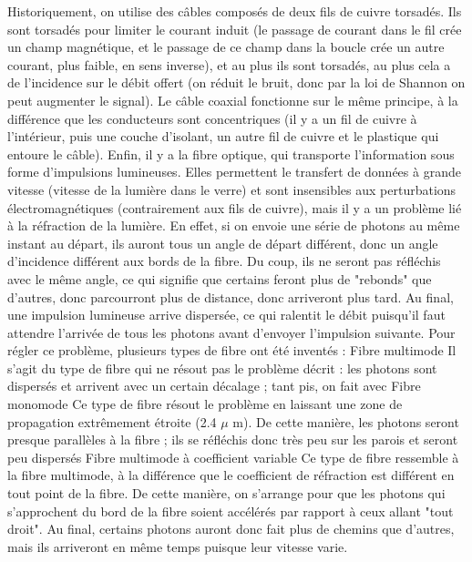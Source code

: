 Historiquement, on utilise des câbles composés de deux fils de cuivre torsadés. Ils sont
torsadés pour limiter le courant induit (le passage de courant dans le fil crée un champ magnétique, et le passage de ce champ dans la boucle crée un autre courant, plus faible,
en sens inverse), et au plus ils sont torsadés, au plus cela a de l'incidence sur le débit
offert (on réduit le bruit, donc par la loi de Shannon on peut augmenter le signal).
Le câble coaxial fonctionne sur le même principe, à la différence que les conducteurs
sont concentriques (il y a un fil de cuivre à l'intérieur, puis une couche d'isolant, un autre fil de cuivre et le plastique qui entoure le câble).
Enfin, il y a la fibre optique, qui transporte l'information sous forme d'impulsions
lumineuses. Elles permettent le transfert de données à grande vitesse (vitesse de la lumière
dans le verre) et sont insensibles aux perturbations électromagnétiques (contrairement
aux fils de cuivre), mais il y a un problème lié à la réfraction de la lumière. En effet,
si on envoie une série de photons au même instant au départ, ils auront tous un angle
de départ différent, donc un angle d'incidence différent aux bords de la fibre. Du coup,
ils ne seront pas réfléchis avec le même angle, ce qui signifie que certains feront plus de
"rebonds" que d'autres, donc parcourront plus de distance, donc arriveront plus tard.
Au final, une impulsion lumineuse arrive dispersée, ce qui ralentit le débit puisqu'il faut
attendre l'arrivée de tous les photons avant d'envoyer l'impulsion suivante. Pour régler
ce problème, plusieurs types de fibre ont été inventés :
Fibre multimode Il s'agit du type de fibre qui ne résout pas le problème décrit : les
photons sont dispersés et arrivent avec un certain décalage ; tant pis, on fait avec
Fibre monomode Ce type de fibre résout le problème en laissant une zone de propagation
extrêmement étroite (2.4 $\mu$ m). De cette manière, les photons seront presque
parallèles à la fibre ; ils se réfléchis donc très peu sur les parois et seront peu
dispersés
Fibre multimode à coefficient variable Ce type de fibre ressemble à la fibre multimode,
à la différence que le coefficient de réfraction est différent en tout point de
la fibre. De cette manière, on s'arrange pour que les photons qui s'approchent du
bord de la fibre soient accélérés par rapport à ceux allant "tout droit". Au final,
certains photons auront donc fait plus de chemins que d'autres, mais ils arriveront
en même temps puisque leur vitesse varie.